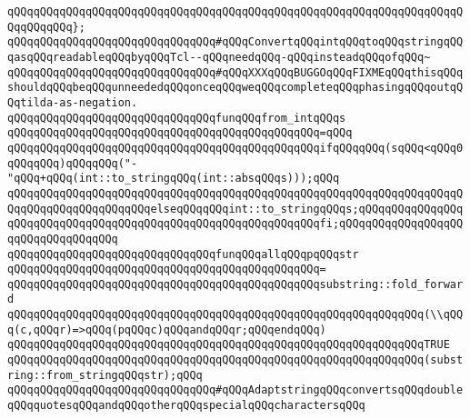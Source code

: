 \verb|qQQqqQQqqQQqqQQqqQQqqQQqqQQqqQQqqQQqqQQqqQQqqQQqqQQqqQQqqQQqqQQqqQQqqQQqqQQqqQQq};|\newline
\newline
\newline
\verb|qQQqqQQqqQQqqQQqqQQqqQQqqQQqqQQq#qQQqConvertqQQqintqQQqtoqQQqstringqQQqasqQQqreadableqQQqbyqQQqTcl--qQQqneedqQQq-qQQqinsteadqQQqofqQQq~|\newline
\verb|qQQqqQQqqQQqqQQqqQQqqQQqqQQqqQQq#qQQqXXXqQQqBUGGOqQQqFIXMEqQQqthisqQQqshouldqQQqbeqQQqunneededqQQqonceqQQqweqQQqcompleteqQQqphasingqQQqoutqQQqtilda-as-negation.|\newline
\newline
\verb|qQQqqQQqqQQqqQQqqQQqqQQqqQQqqQQqfunqQQqfrom_intqQQqs|\newline
\verb|qQQqqQQqqQQqqQQqqQQqqQQqqQQqqQQqqQQqqQQqqQQqqQQq=qQQq|\newline
\verb|qQQqqQQqqQQqqQQqqQQqqQQqqQQqqQQqqQQqqQQqqQQqqQQqifqQQqqQQq(sqQQq<qQQq0qQQqqQQq)qQQqqQQq("-"qQQq+qQQq(int::to_stringqQQq(int::absqQQqs)));qQQq|\newline
\verb|qQQqqQQqqQQqqQQqqQQqqQQqqQQqqQQqqQQqqQQqqQQqqQQqqQQqqQQqqQQqqQQqqQQqqQQqqQQqqQQqqQQqqQQqqQQqelseqQQqqQQqint::to_stringqQQqs;qQQqqQQqqQQqqQQqqQQqqQQqqQQqqQQqqQQqqQQqqQQqqQQqqQQqqQQqqQQqqQQqfi;qQQqqQQqqQQqqQQqqQQqqQQqqQQqqQQqqQQq|\newline
\newline
\verb|qQQqqQQqqQQqqQQqqQQqqQQqqQQqqQQqfunqQQqallqQQqpqQQqstr|\newline
\verb|qQQqqQQqqQQqqQQqqQQqqQQqqQQqqQQqqQQqqQQqqQQqqQQq=|\newline
\verb|qQQqqQQqqQQqqQQqqQQqqQQqqQQqqQQqqQQqqQQqqQQqqQQqsubstring::fold_forward|\newline
\verb|qQQqqQQqqQQqqQQqqQQqqQQqqQQqqQQqqQQqqQQqqQQqqQQqqQQqqQQqqQQqqQQq(\\qQQq(c,qQQqr)=>qQQq(pqQQqc)qQQqandqQQqr;qQQqendqQQq)|\newline
\verb|qQQqqQQqqQQqqQQqqQQqqQQqqQQqqQQqqQQqqQQqqQQqqQQqqQQqqQQqqQQqqQQqTRUE|\newline
\verb|qQQqqQQqqQQqqQQqqQQqqQQqqQQqqQQqqQQqqQQqqQQqqQQqqQQqqQQqqQQqqQQq(substring::from_stringqQQqstr);qQQq|\newline
\newline
\newline
\newline
\verb|qQQqqQQqqQQqqQQqqQQqqQQqqQQqqQQq#qQQqAdaptstringqQQqconvertsqQQqdoubleqQQqquotesqQQqandqQQqotherqQQqspecialqQQqcharactersqQQq|\newline
